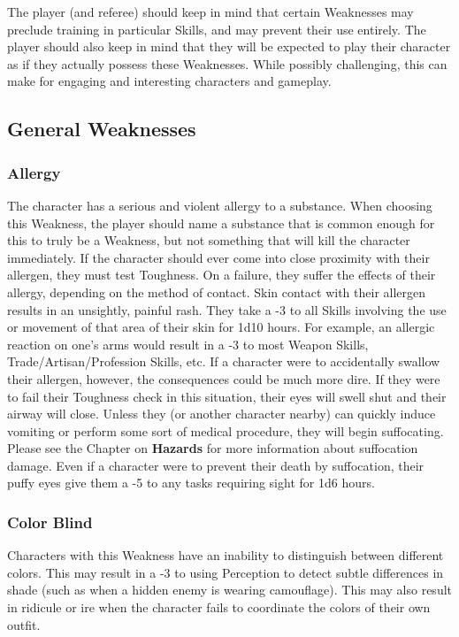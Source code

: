 \documentclass[oneside]{book}
\begin{document}
The player (and referee) should keep in mind that certain Weaknesses may preclude training in particular Skills, and may prevent their use entirely. The player should also keep in mind that they will be expected to play their character as if they actually possess these Weaknesses. While possibly challenging, this can make for engaging and interesting characters and gameplay.  
\newpage
\begin{multicols}{2}
\section{General Weaknesses}
\subsubsection{Allergy}
The character has a serious and violent allergy to a substance. When choosing this Weakness, the player should name a substance that is common enough for this to truly be a Weakness, but not something that will kill the character immediately. If the character should ever come into close proximity with their allergen, they must test Toughness. On a failure, they suffer the effects of their allergy, depending on the method of contact. Skin contact with their allergen results in an unsightly, painful rash. They take a -3 to all Skills involving the use or movement of that area of their skin for 1d10 hours. For example, an allergic reaction on one's arms would result in a -3 to most Weapon Skills, Trade/Artisan/Profession Skills, etc. If a character were to accidentally swallow their allergen, however, the consequences could be much more dire. If they were to fail their Toughness check in this situation, their eyes will swell shut and their airway will close. Unless they (or another character nearby) can quickly induce vomiting or perform some sort of medical procedure, they will begin suffocating. Please see the Chapter on \textbf{Hazards} for more information about suffocation damage. Even if a character were to prevent their death by suffocation, their puffy eyes give them a -5 to any tasks requiring sight for 1d6 hours.
\subsubsection{Color Blind}
Characters with this Weakness have an inability to distinguish between different colors. This may result in a -3 to using Perception to detect subtle differences in shade (such as when a hidden enemy is wearing camouflage). This may also result in ridicule or ire when the character fails to coordinate the colors of their own outfit. 

\end{multicols}
\end{document}
